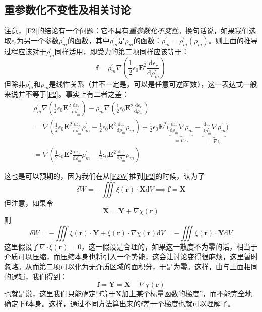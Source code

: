 \documentclass{ctexart}
\newcommand{\epsz}{\epsilon_0}
\newcommand{\epsr}{\epsilon_r}
\newcommand{\bfr}{\mathbf r}
\newcommand{\dd}[2]{\frac{\mathrm d #1}{\mathrm d #2}}
\begin{document}
	\subsection{重参数化不变性及相关讨论}\label{sec:Repara}
	
	注意，\eqref{F2}的结论有一个问题：它不具有\textit{重参数化不变性}。换句话说，如果我们选取$\epsilon_r$为另一个参数$\rho_m^\prime$的函数，其中$\rho_m^\prime$是$\rho_m$的函数：$\rho_m^\prime=\rho_m^\prime(\rho_m)$。则上面的推导过程应该对于$\rho_m^\prime$同样适用，即受力的第二项同样应该等于：
	\begin{equation}
	\mathbf f=\rho_m^\prime\nabla\left(\frac{1}{2}\epsz\mathbf E^2\dd{\epsr}{\rho_m^\prime}\right)
	\end{equation}
	但除非$\rho_m^\prime$和$\rho_m$是线性关系（并不一定是，可以是任意可逆函数），这一表达式一般来说并不等于\eqref{F2}。事实上有二者之差：
	\begin{multline}
	\rho_m^\prime\nabla\left(\frac{1}{2}\epsz\mathbf E^2\dd{\epsr}{\rho_m^\prime}\right)-\rho_m\nabla\left(\frac{1}{2}\epsz\mathbf E^2\dd{\epsr}{\rho_m}\right)\\
	=\nabla\left(\frac{1}{2}\epsz\mathbf E^2\dd{\epsr}{\rho_m^\prime}\rho_m^\prime-\frac{1}{2}\epsz\mathbf E^2\dd{\epsr}{\rho_m}\rho_m\right)+\frac{1}{2}\epsz\mathbf E^2\bigg(\underbrace{\dd{\epsr}{\rho_m}\nabla\rho_m}_{=\nabla\epsr}-\underbrace{\dd{\epsr}{\rho_m^\prime}\nabla\rho_m^\prime}_{=\nabla\epsr}\bigg)\\
	=\nabla\left(\frac{1}{2}\epsz\mathbf E^2\dd{\epsr}{\rho_m^\prime}\rho_m^\prime-\frac{1}{2}\epsz\mathbf E^2\dd{\epsr}{\rho_m}\rho_m\right)
	\end{multline}
	
	这也是可以预期的，因为我们在从\eqref{F2W}推到\eqref{F2}的时候，认为了
	\begin{equation}
	\delta W=-\iiint \xi(\bfr)\cdot\mathbf X\mathrm dV\implies \mathbf f=\mathbf X
	\end{equation}
	但注意，如果令
	\begin{equation}
	\mathbf X=\mathbf Y+\nabla\chi(\bfr)
	\end{equation}
	则
	\begin{equation}
	\delta W=-\iiint \xi(\bfr)\cdot\mathbf Y+\xi(\bfr)\cdot\nabla\chi(\bfr)\mathrm dV=-\iiint \xi(\bfr)\cdot\mathbf Y\mathrm dV
	\end{equation}
	这里假设了$\nabla\cdot\xi(\bfr)=0$，这一假设是合理的，如果这一散度不为零的话，相当于介质可以压缩，而压缩本身也将引入一个势能，这会让讨论变得很麻烦，这里暂时忽略。从而第二项可以化为无介质区域的面积分，于是为零。这样，由与上面相同的逻辑，我们得到：
	\begin{equation}
	\mathbf f=\mathbf Y=\mathbf X-\nabla\chi(\bfr)
	\end{equation}
	也就是说，这里我们只能确定“$\mathbf f$等于$\mathbf X$加上某个标量函数的梯度”，而不能完全地确定下$\mathbf f$本身。这样，通过不同方法算出来的$\mathbf f$差一个梯度也就可以理解了。
	
\end{document}
